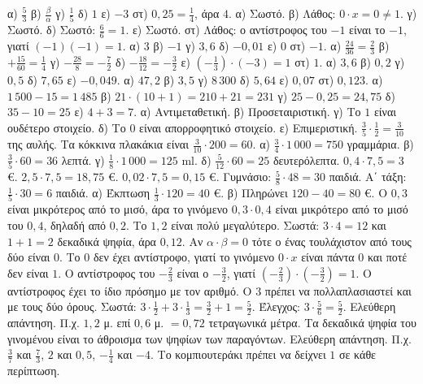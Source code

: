  α) $\frac{5}{3}$ \quad β) $\frac{\beta}{\alpha}$ \quad γ) $\frac{1}{5}$ \quad δ) $1$ \quad ε) $-3$ \quad στ) $0{,}25=\frac{1}{4}$, άρα $4$.
 α) Σωστό. β) Λάθος: $0\cdot x=0\neq1$. γ) Σωστό. δ) Σωστό: $\frac{6}{6}=1$. ε) Σωστό. στ) Λάθος: ο αντίστροφος του $-1$ είναι το $-1$, γιατί $(-1)(-1)=1$.
 α) $3$ \quad β) $-1$ \quad γ) $3{,}6$ \quad δ) $-0{,}01$ \quad ε) $0$ \quad στ) $-1$.
 α) $\frac{24}{36}=\frac{2}{3}$ \quad β) $+\frac{15}{60}=\frac{1}{4}$ \quad γ) $-\frac{28}{8}=-\frac{7}{2}$ \quad δ) $-\frac{18}{12}=-\frac{3}{2}$ \quad ε) $\left(-\frac{1}{3}\right)\cdot(-3)=1$ \quad στ) $1$.
 α) $3{,}6$ \quad β) $0{,}2$ \quad γ) $0{,}5$ \quad δ) $7{,}65$ \quad ε) $-0{,}049$.
 α) $47{,}2$ \quad β) $3{,}5$ \quad γ) $8\,300$ \quad δ) $5{,}64$ \quad ε) $0{,}07$ \quad στ) $0{,}123$.
 α) $1\,500-15=1\,485$ \quad β) $21\cdot(10+1)=210+21=231$ \quad γ) $25-0{,}25=24{,}75$ \quad δ) $35-10=25$ \quad ε) $4+3=7$.
 α) Αντιμεταθετική. β) Προσεταιριστική. γ) Το $1$ είναι ουδέτερο στοιχείο. δ) Το $0$ είναι απορροφητικό στοιχείο. ε) Επιμεριστική.
 $\frac{3}{5}\cdot\frac{1}{2}=\frac{3}{10}$ της αυλής. Τα κόκκινα πλακάκια είναι $\frac{3}{10}\cdot200=60$.
 α) $\frac{3}{4}\cdot1\,000=750$ γραμμάρια. β) $\frac{3}{5}\cdot60=36$ λεπτά. γ) $\frac{1}{8}\cdot1\,000=125$ ml. δ) $\frac{5}{12}\cdot60=25$ δευτερόλεπτα.
 $0{,}4\cdot7{,}5=3$ €. $2{,}5\cdot7{,}5=18{,}75$ €. $0{,}02\cdot7{,}5=0{,}15$ €.
 Γυμνάσιο: $\frac{5}{8}\cdot48=30$ παιδιά. Α΄ τάξη: $\frac{1}{5}\cdot30=6$ παιδιά.
 α) Έκπτωση $\frac{1}{3}\cdot120=40$ €. β) Πληρώνει $120-40=80$ €.
 Ο $0{,}3$ είναι μικρότερος από το μισό, άρα το γινόμενο $0{,}3\cdot0{,}4$ είναι μικρότερο από το μισό του $0{,}4$, δηλαδή από $0{,}2$. Το $1{,}2$ είναι πολύ μεγαλύτερο. Σωστά: $3\cdot4=12$ και $1+1=2$ δεκαδικά ψηφία, άρα $0{,}12$.
 Αν $\alpha\cdot\beta=0$ τότε ο ένας τουλάχιστον από τους δύο είναι $0$. Το $0$ δεν έχει αντίστροφο, γιατί το γινόμενο $0\cdot x$ είναι πάντα $0$ και ποτέ δεν είναι $1$.
 Ο αντίστροφος του $-\frac{2}{3}$ είναι ο $-\frac{3}{2}$, γιατί $\left(-\frac{2}{3}\right)\cdot\left(-\frac{3}{2}\right)=1$. Ο αντίστροφος έχει το ίδιο πρόσημο με τον αριθμό.
 Ο $3$ πρέπει να πολλαπλασιαστεί και με τους δύο όρους. Σωστά: $3\cdot\frac{1}{2}+3\cdot\frac{1}{3}=\frac{3}{2}+1=\frac{5}{2}$. Έλεγχος: $3\cdot\frac{5}{6}=\frac{5}{2}$.
 Ελεύθερη απάντηση. Π.χ. $1{,}2$ μ. επί $0{,}6$ μ. $=0{,}72$ τετραγωνικά μέτρα. Τα δεκαδικά ψηφία του γινομένου είναι το άθροισμα των ψηφίων των παραγόντων.
 Ελεύθερη απάντηση. Π.χ. $\frac{3}{7}$ και $\frac{7}{3}$, $2$ και $0{,}5$, $-\frac{1}{4}$ και $-4$. Το κομπιουτεράκι πρέπει να δείχνει $1$ σε κάθε περίπτωση.
